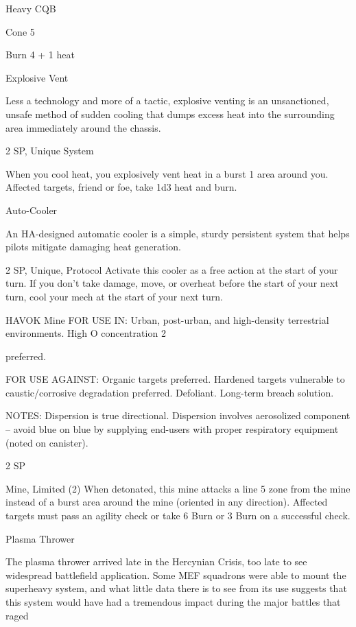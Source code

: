 Heavy CQB

Cone 5

Burn 4 + 1 heat


Explosive Vent

Less a technology and more of a tactic, explosive venting is an unsanctioned, unsafe method of sudden
cooling that dumps excess heat into the surrounding area immediately around the chassis.

2 SP, Unique
System




When you cool heat, you explosively vent heat in a burst 1 area around you. Affected targets,
friend or foe, take 1d3 heat and burn.


Auto-Cooler

An HA-designed automatic cooler is a simple, sturdy persistent system that helps pilots mitigate damaging
heat generation.

2 SP, Unique, Protocol
Activate this cooler as a free action at the start of your turn. If you don’t take damage, move, or
overheat before the start of your next turn, cool your mech at the start of your next turn.


HAVOK Mine
FOR USE IN: Urban, post-urban, and high-density terrestrial environments. High O   concentration
                                                                                              2

preferred.

FOR USE AGAINST: Organic targets preferred. Hardened targets vulnerable to caustic/corrosive
degradation preferred. Defoliant. Long-term breach solution.

NOTES: Dispersion is true directional. Dispersion involves aerosolized component -- avoid blue on blue by
supplying end-users with proper respiratory equipment (noted on canister).

2 SP

Mine, Limited (2)
When detonated, this mine attacks a line 5 zone from the mine instead of a burst area around the
mine (oriented in any direction). Affected targets must pass an agility check or take 6 Burn or 3
Burn on a successful check.


Plasma Thrower

The plasma thrower arrived late in the Hercynian Crisis, too late to see widespread battlefield application.
Some MEF squadrons were able to mount the superheavy system, and what little data there is to see from
its use suggests that this system would have had a tremendous impact during the major battles that raged

